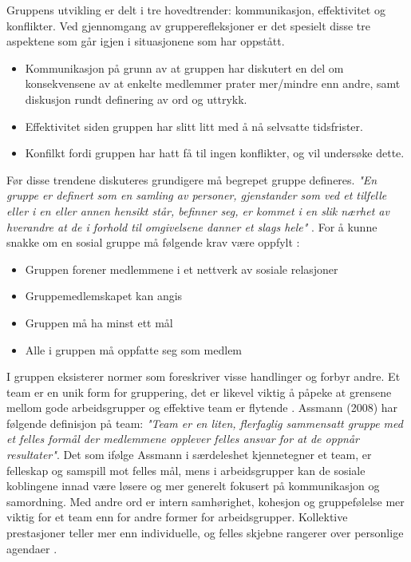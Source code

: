 Gruppens utvikling er delt i tre hovedtrender: kommunikasjon, effektivitet og konflikter.
Ved gjennomgang av grupperefleksjoner er det spesielt disse tre aspektene som går igjen i situasjonene som har oppstått.
\begin{itemize}
\item Kommunikasjon på grunn av at gruppen har diskutert en del om konsekvensene av at enkelte medlemmer prater mer/mindre enn andre, samt diskusjon rundt definering av ord og uttrykk.
\item Effektivitet siden gruppen har slitt litt med å nå selvsatte tidsfrister.
\item Konfilkt fordi gruppen har hatt få til ingen konflikter, og vil undersøke dette.
\end{itemize}

Før disse trendene diskuteres grundigere må begrepet gruppe defineres. 
\emph{"En gruppe er definert som en samling av personer, gjenstander som ved et tilfelle eller i en eller annen hensikt står, befinner seg, er kommet i en slik nærhet av hverandre at de i forhold til omgivelsene danner et slags hele"} \cite{prosjekteringsledelse}.
For å kunne snakke om en sosial gruppe må følgende krav være oppfylt \cite{orgorg}:
\begin{itemize}
\item Gruppen forener medlemmene i et nettverk av sosiale relasjoner
\item Gruppemedlemskapet kan angis
\item Gruppen må ha minst ett mål
\item Alle i gruppen må oppfatte seg som medlem
\end{itemize}
I gruppen eksisterer normer som foreskriver visse handlinger og forbyr andre.
Et team er en unik form for gruppering, det er likevel viktig å påpeke at grensene mellom gode arbeidsgrupper og effektive team er flytende \cite{orgorg}.
Assmann (2008) har følgende definisjon på team: \emph{"Team er en liten, flerfaglig sammensatt gruppe med et felles formål der medlemmene opplever felles ansvar for at de oppnår resultater"}.
Det som ifølge Assmann i særdeleshet kjennetegner et team, er felleskap og samspill mot felles mål, mens i arbeidsgrupper kan de sosiale koblingene innad være løsere og mer generelt fokusert på kommunikasjon og samordning.
Med andre ord er intern samhørighet, kohesjon og gruppefølelse mer viktig for et team enn for andre former for arbeidsgrupper.
Kollektive prestasjoner teller mer enn individuelle, og felles skjebne rangerer over personlige agendaer \cite{orgorg}.